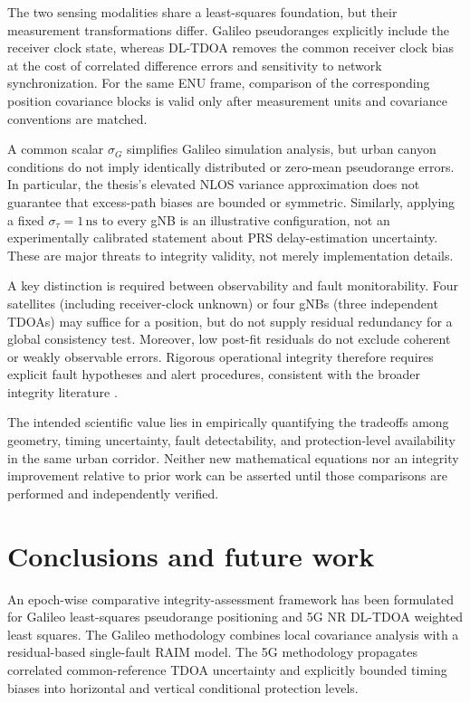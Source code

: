 \documentclass[pdflatex,sn-mathphys-num]{sn-jnl}
\begin{document}
The two sensing modalities share a least-squares foundation, but their
measurement transformations differ. Galileo pseudoranges explicitly
include the receiver clock state, whereas DL-TDOA removes the common
receiver clock bias at the cost of correlated difference errors and
sensitivity to network synchronization. For the same ENU frame,
comparison of the corresponding position covariance blocks is valid
only after measurement units and covariance conventions are matched.

A common scalar $\sigma_G$ simplifies Galileo simulation analysis, but
urban canyon conditions do not imply identically distributed or
zero-mean pseudorange errors. In particular, the thesis's elevated
NLOS variance approximation does not guarantee that excess-path
biases are bounded or symmetric. Similarly, applying a fixed
$\sigma_\tau=1\,\mathrm{ns}$ to every gNB is an illustrative
configuration, not an experimentally calibrated statement about
PRS delay-estimation uncertainty. These are major threats to
integrity validity, not merely implementation details.

A key distinction is required between observability and fault
monitorability. Four satellites (including receiver-clock unknown)
or four gNBs (three independent TDOAs) may suffice for a position,
but do not supply residual redundancy for a global consistency test.
Moreover, low post-fit residuals do not exclude coherent or
weakly observable errors. Rigorous operational integrity therefore
requires explicit fault hypotheses and alert procedures, consistent
with the broader integrity literature \cite{Brown1992,Bartoletti2025}.

The intended scientific value lies in empirically quantifying the
tradeoffs among geometry, timing uncertainty, fault detectability,
and protection-level availability in the same urban corridor.
Neither new mathematical equations nor an integrity improvement
relative to prior work can be asserted until those comparisons are
performed and independently verified.

\section{Conclusions and future work}\label{sec:conclusions}

An epoch-wise comparative integrity-assessment framework has been
formulated for Galileo least-squares pseudorange positioning and
5G NR DL-TDOA weighted least squares. The Galileo methodology
combines local covariance analysis with a residual-based single-fault
RAIM model. The 5G methodology propagates correlated common-reference
TDOA uncertainty and explicitly bounded timing biases into
horizontal and vertical conditional protection levels.
\end{document}
